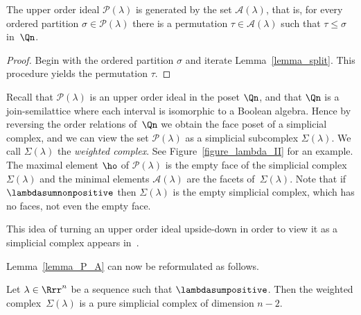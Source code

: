 \begin{lemma}
The upper order ideal $\mathcal{P}(\lambda)$
is generated by the set $\mathcal{A}(\lambda)$,
that is, for every ordered partition $\sigma \in \mathcal{P}(\lambda)$
there is a permutation $\tau \in \mathcal{A}(\lambda)$
such that $\tau \leq \sigma$ in~$\Qn$.
\label{lemma_P_A}
\end{lemma}
\begin{proof}
Begin with the ordered partition $\sigma$
and iterate Lemma~\ref{lemma_split}.
This procedure yields the permutation $\tau$.
\end{proof}




Recall that $\mathcal{P}(\lambda)$
is an upper order ideal in the poset $\Qn$, and that
$\Qn$ is a join-semilattice
where each interval is isomorphic to a Boolean algebra.
Hence by reversing the order relations of~$\Qn$
we obtain the face poset of a simplicial
complex, and
we can view the set $\mathcal{P}(\lambda)$
as a simplicial subcomplex
$\Sigma(\lambda)$.
We call
$\Sigma(\lambda)$
the \emph{weighted complex}.
See Figure~\ref{figure_lambda_II} for an example.
The maximal element $\ho$ of $\mathcal{P}(\lambda)$
is the empty face of the simplicial complex $\Sigma(\lambda)$ 
and the minimal elements $\mathcal{A}(\lambda)$ are
the facets of~$\Sigma(\lambda)$.
Note that if $\lambdasumnonpositive$ then
$\Sigma(\lambda)$ is the empty simplicial complex,
which has no faces, not even the empty face.

This idea of turning an upper order ideal upside-down
in order to view it as a simplicial complex
appears in~\cite{Ehrenborg_Hedmark,Ehrenborg_Jung}.




Lemma~\ref{lemma_P_A}
can now be reformulated as follows.
\begin{lemma}
Let $\lambda \in \Rrr^{n}$ be a sequence
such that $\lambdasumpositive$.
Then
the weighted complex~$\Sigma(\lambda)$
is a pure simplicial complex of dimension $n-2$.
\label{lemma_pure}
\end{lemma}



